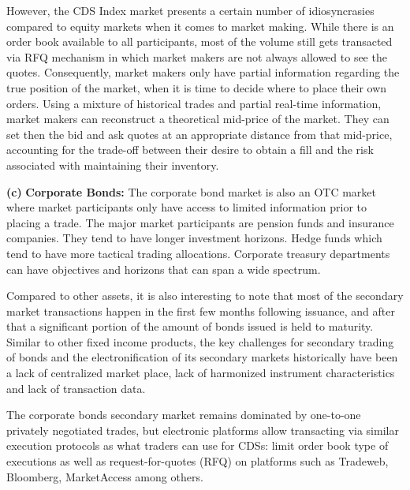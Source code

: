 However, the CDS Index market presents a certain number of idiosyncrasies compared to equity markets when it comes to market making. While there is an order book available to all participants, most of the volume still gets transacted via RFQ mechanism in which market makers are not always allowed to see the quotes. Consequently, market makers only have partial information regarding the true position of the market, when it is time to decide where to place their own orders. Using a mixture of historical trades and partial real-time information, market makers can reconstruct a theoretical mid-price of the market. They can set then the bid and ask quotes at an appropriate distance from that mid-price, accounting for the trade-off between their desire to obtain a fill and the risk associated with maintaining their inventory. \twomedskip


\noindent\textbf{(c)} \textbf{Corporate Bonds:} The corporate bond market is also an OTC market where market participants only have access to limited information prior to placing a trade. The major market participants are pension funds and insurance companies. They tend to have longer investment horizons. Hedge funds which tend to have more tactical trading allocations. Corporate treasury departments can have objectives and horizons that can span a wide spectrum.


Compared to other assets, it is also interesting to note that most of the secondary market transactions happen in the first few months following issuance, and after that a significant portion of the amount of bonds issued is held to maturity. Similar to other fixed income products, the key challenges for secondary trading of bonds and the electronification of its secondary markets historically have been a lack of centralized market place, lack of harmonized instrument characteristics and lack of transaction data.


The corporate bonds secondary market remains dominated by one-to-one privately negotiated trades, but electronic platforms allow transacting via similar execution protocols as what traders can use for CDSs: limit order book type of executions as well as request-for-quotes (RFQ) on platforms such as Tradeweb, Bloomberg, MarketAccess among others.



